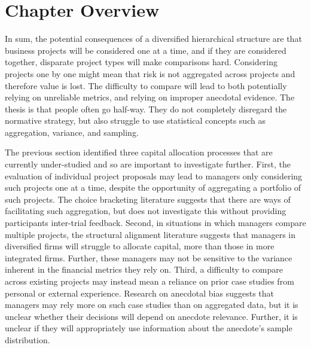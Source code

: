 \documentclass[a4paper, nobind]{templates/ociamthesis}
\theoremstyle{definition}
\theoremstyle{definition}
\theoremstyle{definition}
\theoremstyle{definition}
\theoremstyle{remark}
\begin{document}
\hypertarget{chapter-overview}{%
\section{Chapter Overview}\label{chapter-overview}}

In sum, the potential consequences of a diversified hierarchical structure are
that business projects will be considered one at a time, and if they are
considered together, disparate project types will make comparisons hard.
Considering projects one by one might mean that risk is not aggregated across
projects and therefore value is lost. The difficulty to compare will lead to
both potentially relying on unreliable metrics, and relying on improper
anecdotal evidence. The thesis is that people often go half-way. They do not
completely disregard the normative strategy, but also struggle to use
statistical concepts such as aggregation, variance, and sampling.

The previous section identified three capital allocation processes that are
currently under-studied and so are important to investigate further. First, the
evaluation of individual project proposals may lead to managers only considering
such projects one at a time, despite the opportunity of aggregating a portfolio
of such projects. The choice bracketing literature suggests that there are ways
of facilitating such aggregation, but does not investigate this without
providing participants inter-trial feedback. Second, in situations in which
managers compare multiple projects, the structural alignment literature suggests
that managers in diversified firms will struggle to allocate capital, more than
those in more integrated firms. Further, these managers may not be sensitive to
the variance inherent in the financial metrics they rely on. Third, a difficulty
to compare across existing projects may instead mean a reliance on prior case
studies from personal or external experience. Research on anecdotal bias
suggests that managers may rely more on such case studies than on aggregated
data, but it is unclear whether their decisions will depend on anecdote
relevance. Further, it is unclear if they will appropriately use information
about the anecdote's sample distribution.
\end{document}
